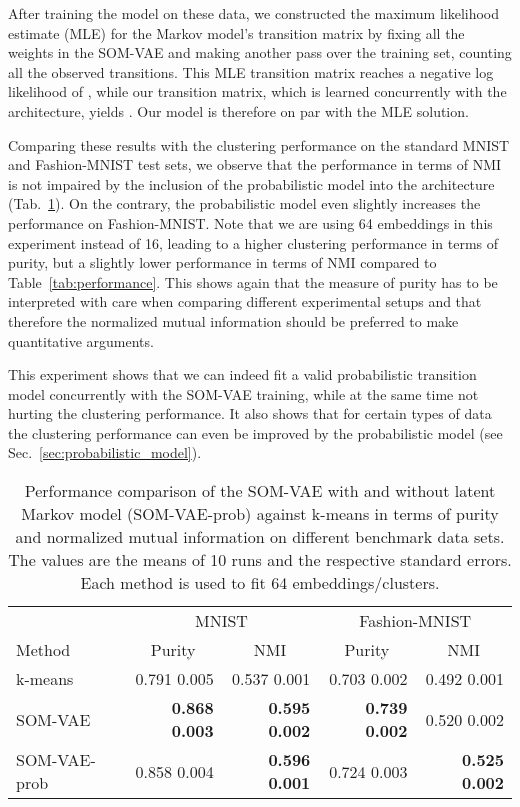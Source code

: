 \documentclass{article}
\begin{document}
After training the model on these data, we constructed the maximum likelihood estimate (MLE) for the Markov model's transition matrix by fixing all the weights in the SOM-VAE and making another pass over the training set, counting all the observed transitions.
This MLE transition matrix reaches a negative log likelihood of , while our transition matrix, which is learned concurrently with the architecture, yields .
Our model is therefore on par with the MLE solution.

Comparing these results with the clustering performance on the standard MNIST and Fashion-MNIST test sets, we observe that the performance in terms of NMI is not impaired by the inclusion of the probabilistic model into the architecture (Tab.~\ref{tab:performance_prob}).
On the contrary, the probabilistic model even slightly increases the performance on Fashion-MNIST.
Note that we are using 64 embeddings in this experiment instead of 16, leading to a higher clustering performance in terms of purity, but a slightly lower performance in terms of NMI compared to Table~\ref{tab:performance}.
This shows again that the measure of purity has to be interpreted with care when comparing different experimental setups and that therefore the normalized mutual information should be preferred to make quantitative arguments.

This experiment shows that we can indeed fit a valid probabilistic transition model concurrently with the SOM-VAE training, while at the same time not hurting the clustering performance.
It also shows that for certain types of data the clustering performance can even be improved by the probabilistic model (see Sec.~\ref{sec:probabilistic_model}).

\begin{table}
    \centering
    \caption{Performance comparison of the SOM-VAE with and without latent Markov model (SOM-VAE-prob) against k-means in terms of purity and normalized mutual information on different benchmark data sets. The values are the means of 10 runs and the respective standard errors. Each method is used to fit 64 embeddings/clusters.}
    \begin{tabular}{lrrrr}
        \toprule
         & \multicolumn{2}{c}{MNIST} & \multicolumn{2}{c}{Fashion-MNIST} \\
        \cmidrule(rl){2-3}
        \cmidrule(rl){4-5}
        Method & \multicolumn{1}{c}{Purity} & \multicolumn{1}{c}{NMI} & \multicolumn{1}{c}{Purity} & \multicolumn{1}{c}{NMI} \\
         \midrule
         k-means & 0.791  0.005 & 0.537  0.001 & 0.703  0.002 & 0.492  0.001 \\
         SOM-VAE & \textbf{0.868  0.003} & \textbf{0.595  0.002} & \textbf{0.739  0.002} & 0.520  0.002 \\
         SOM-VAE-prob & 0.858  0.004 & \textbf{0.596  0.001} & 0.724  0.003 & \textbf{0.525  0.002} \\
         \bottomrule
    \end{tabular}
    \label{tab:performance_prob}
\end{table}
\end{document}
